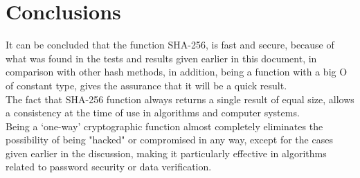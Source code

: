 \documentclass[journal]{IEEEtran}
\begin{document}
\section{Conclusions}
It can be concluded that the function SHA-256, is fast and secure, because of what was found in the tests and results given earlier in this document, in comparison with other hash methods, in addition, being a function with a big O of constant type, gives the assurance that it will be a quick result.\\The fact that SHA-256 function always returns a single result of equal size, allows a consistency at the time of use in algorithms and computer systems.\\ Being a ‘one-way’ cryptographic function almost completely eliminates the possibility of being "hacked" or compromised in any way, except for the cases given earlier in the discussion, making it particularly effective in algorithms related to password security or data verification.
\end{document}
